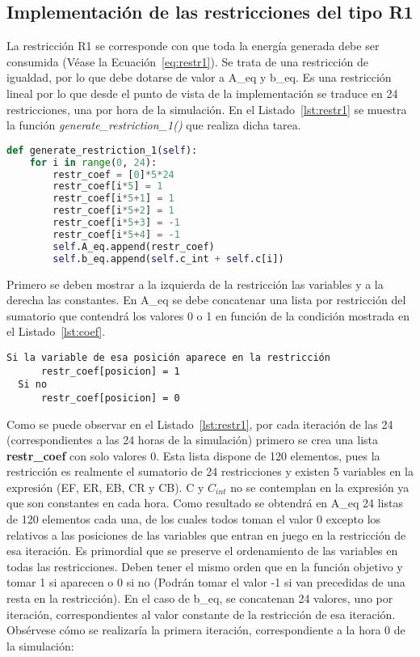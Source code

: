 \subsection{Implementación de las restricciones del tipo R1}
La restricción R1 se corresponde con que toda la energía generada debe ser consumida (Véase la Ecuación~\ref{eq:restr1}). Se trata de una restricción de igualdad, por lo que debe dotarse de valor a A\_eq y b\_eq. Es una restricción lineal por lo que desde el punto de vista de la implementación se traduce en 24 restricciones, una por hora de la simulación. En el Listado~\ref{lst:restr1} se muestra la función \textit{generate\_restriction\_1()} que realiza dicha tarea.\\
\begin{lstlisting}[language=Python,float=ht,caption={Restricciones del tipo R1},label={lst:restr1}]
def generate_restriction_1(self):
    for i in range(0, 24):
        restr_coef = [0]*5*24
        restr_coef[i*5] = 1
        restr_coef[i*5+1] = 1
        restr_coef[i*5+2] = 1
        restr_coef[i*5+3] = -1
        restr_coef[i*5+4] = -1
        self.A_eq.append(restr_coef)
        self.b_eq.append(self.c_int + self.c[i])
\end{lstlisting}

Primero se deben mostrar a la izquierda de la restricción las variables y a la derecha las constantes. En A\_eq se debe concatenar una lista por restricción del sumatorio que contendrá los valores 0 o 1 en función de la condición mostrada en el Listado~\ref{lst:coef}.\\

\begin{lstlisting}[numbers=none,float=ht,caption={Condición para dotar de valor los coeficientes},label={lst:coef}]
  Si la variable de esa posición aparece en la restricción
      restr_coef[posicion] = 1
  Si no
      restr_coef[posicion] = 0
\end{lstlisting}
Como se puede observar en el Listado~\ref{lst:restr1}, por cada iteración de las 24 (correspondientes a las 24 horas de la simulación) primero se crea una lista \textbf{restr\_coef} con solo valores 0. Esta lista dispone de 120 elementos, pues la restricción es realmente el sumatorio de 24 restricciones y existen 5 variables en la expresión (EF, ER, EB, CR y CB). C y $ C_{int}$ no se contemplan en la expresión ya que son constantes en cada hora. Como resultado se obtendrá en A\_eq 24 listas de 120 elementos cada una, de los cuales todos toman el valor 0 excepto los relativos a las posiciones de las variables que entran en juego en la restricción de esa iteración. Es primordial que se preserve el ordenamiento de las variables en todas las restricciones. Deben tener el mismo orden que en la función objetivo y tomar 1 si aparecen o 0 si no (Podrán tomar el valor -1 si van precedidas de una resta en la restricción). En el caso de b\_eq, se concatenan 24 valores, uno por iteración, correspondientes al valor constante de la restricción de esa iteración. Obsérvese cómo se realizaría la primera iteración, correspondiente a la hora 0 de la simulación:\\

